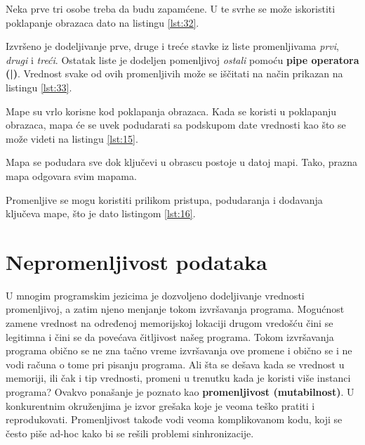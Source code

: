 \documentclass[12pt,oneside]{memoir}
\begin{document}


Neka prve tri osobe treba da budu zapamćene. U te svrhe se može iskoristiti poklapanje obrazaca dato na listingu \ref{lst:32}.



Izvršeno je dodeljivanje prve, druge i treće stavke iz liste promenljivama \textit{prvi}, \textit{drugi} i \textit{treći}. Ostatak liste je dodeljen pomenljivoj \textit{ostali} pomoću \textbf{pipe operatora (|)}. Vrednost svake od ovih promenljivih može se iščitati na način prikazan na listingu \ref{lst:33}.



Mape su vrlo korisne kod poklapanja obrazaca. Kada se koristi u poklapanju obrazaca, mapa će se uvek podudarati sa podskupom date vrednosti kao što se može videti na listingu \ref{lst:15}.
 


\noindent Mapa se podudara sve dok ključevi u obrascu postoje u datoj mapi. Tako, prazna mapa odgovara svim mapama.

Promenljive se mogu koristiti prilikom pristupa, podudaranja i dodavanja ključeva mape, što je dato listingom \ref{lst:16}.



\section{Nepromenljivost podataka}
\label{odeljak:nepromenljivostPodataka}

U mnogim programskim jezicima je dozvoljeno dodeljivanje vrednosti promenljivoj, a zatim njeno menjanje tokom izvršavanja programa. Mogućnost zamene vrednost na određenoj memorijskoj lokaciji drugom vredošću čini se legitimna i čini se da povećava čitljivost našeg programa. Tokom izvršavanja programa obično se ne zna tačno vreme izvršavanja ove promene i obično se i ne vodi računa o tome pri pisanju programa. Ali šta se dešava kada se vrednost u memoriji, ili čak i tip vrednosti, promeni u trenutku kada je koristi više instanci programa?  Ovakvo ponašanje je poznato kao \textbf{promenljivost (mutabilnost)}. U konkurentnim okruženjima je izvor grešaka koje je veoma teško pratiti i reprodukovati. Promenljivost takođe vodi veoma komplikovanom kodu, koji se često piše ad-hoc kako bi se rešili problemi sinhronizacije.
\end{document}
